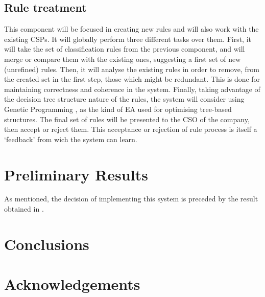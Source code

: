 \documentclass{sig-alternate}
\begin{document}
\subsection{Rule treatment}
\label{subsec:ruletreatment}

This component will be focused in creating new rules and will also work with the existing CSPs.
It will globally perform three different tasks over them. First, it will take the set of classification rules from the previous component, and will merge or compare them with the existing ones, suggesting a first set of new (unrefined) rules. Then, it will analyse the existing rules in order to remove, from the created set in the first step, those which might be redundant. This is done for maintaining correctness and coherence in the system. Finally, taking advantage of the decision tree structure nature of the rules, the system will consider using Genetic Programming \cite{koza1992genetic}, as the kind of EA used for optimising tree-based structures. The final set of rules will be presented to the CSO of the company, then accept or reject them. This acceptance or rejection of rule process is itself a `feedback' from wich the system can learn.

%
%
\section{Preliminary Results}
\label{sec:results}

As mentioned, the decision of implementing this system is preceded by the result obtained in \cite{mora14:urls}. 

%
%
\section{Conclusions}
\label{sec:conclusions}

%
%
\section{Acknowledgements}



\end{document}
